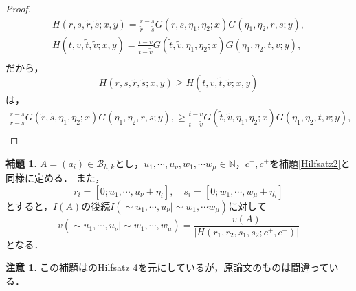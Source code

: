 \documentclass[10pt,a4paper]{ujarticle}
\theoremstyle{definition}
\newtheorem{lemma}{補題}
\newtheorem{remark}{注意}
\begin{document}
\begin{proof}
  \begin{align*}
    H(r,s,\tilde{r},\tilde{s}; x, y) = 
    \frac{r - s}{\tilde{r} - \tilde{s}}
    G(\tilde{r}, \tilde{s}, \eta_1, \eta_2; x)G(\eta_1, \eta_2, r, s; y), \\
    H(t,v,\tilde{t},\tilde{v}; x, y) = 
    \frac{t - v}{\tilde{t} - \tilde{v}}
    G(\tilde{t}, \tilde{v}, \eta_1, \eta_2; x)G(\eta_1, \eta_2, t, v; y), \\
  \end{align*}
だから，
\[
  H(r,s,\tilde{r},\tilde{s}; x, y) \ge H(t,v,\tilde{t},\tilde{v}; x, y)
\]
は，
\begin{align*}
  \frac{r - s}{\tilde{r} - \tilde{s}}
  G(\tilde{r}, \tilde{s}, \eta_1, \eta_2; x)G(\eta_1, \eta_2, r, s; y),
  \ge 
  \frac{t - v}{\tilde{t} - \tilde{v}}
  G(\tilde{t}, \tilde{v}, \eta_1, \eta_2; x)G(\eta_1, \eta_2, t, v; y), \\
\end{align*}
\end{proof}
\begin{lemma}
  \label{Hilfsatz4}
  $A = (a_i) \in \mathcal{B}_{h,k}$とし，$u_1,\cdots, u_\nu, w_1,\cdots w_\mu \in \mathbb{N}$，$c^-, c^+$を補題\ref{Hilfsatz2}と同様に定める．
  また，
  \[
  r_i = [0;u_1,\cdots, u_\nu + \eta_i], \quad s_i = [0;w_1,\cdots, w_\mu + \eta_i]
  \]
  とすると，$I(A)$の後続$I(\sim u_1,\cdots, u_\nu |\sim w_1,\cdots w_\mu)$に対して
  \[
  v(\sim u_1,\cdots, u_\nu |\sim w_1,\cdots, w_\mu)
  = \frac{v(A)}{|H(r_1,r_2,s_1,s_2; c^+, c^-)|}
  \]
  となる．
\end{lemma}
\begin{remark}
  この補題は\cite{schecker}のHilfsatz 4を元にしているが，原論文のものは間違っている．
\end{remark}
\end{document}
